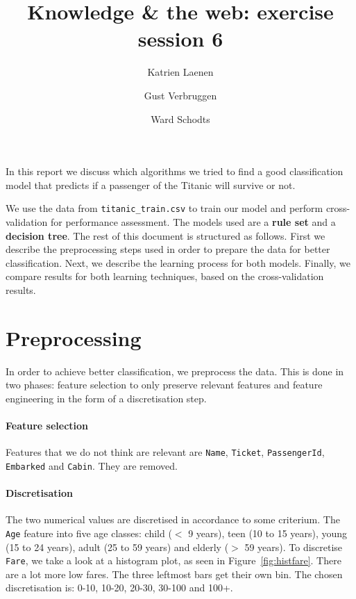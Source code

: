 \documentclass[12pt,a4paper]{article}
\author{
  Katrien Laenen\\
  \and
  Gust Verbruggen\\
  \and
  Ward Schodts
}
\title{Knowledge \& the web: exercise session 6}
\begin{document}
\maketitle
In this report we discuss which algorithms we tried to find a good classification model that predicts if a passenger of the Titanic will survive or not.

We use the data from \texttt{titanic\_train.csv} to train our model and perform cross-validation for performance assessment. The models used are a \textbf{rule set} and a \textbf{decision tree}.  The rest of this document is structured as follows. First we describe the preprocessing steps used in order to prepare the data for better classification. Next, we describe the learning process for both models. Finally, we compare results for both learning techniques, based on the cross-validation results. 

\section{Preprocessing}
In order to achieve better classification, we preprocess the data. This is done in two phases: feature selection to only preserve relevant features and feature engineering in the form of a discretisation step.

\paragraph{Feature selection} Features that we do not think are relevant are \texttt{Name}, \texttt{Ticket}, \texttt{PassengerId}, \texttt{Embarked} and \texttt{Cabin}. They are removed.

\paragraph{Discretisation} The two numerical values are discretised in accordance to some criterium. The \texttt{Age} feature into five age classes: child ($<$ 9 years), teen (10 to 15 years), young (15 to 24 years), adult (25 to 59 years) and elderly ($>$ 59 years). To discretise \texttt{Fare}, we take a look at a histogram plot, as seen in Figure~\ref{fig:histfare}. There are a lot more low fares. The three leftmost bars get their own bin. The chosen discretisation is: 0-10, 10-20, 20-30, 30-100 and 100+.
\end{document}
